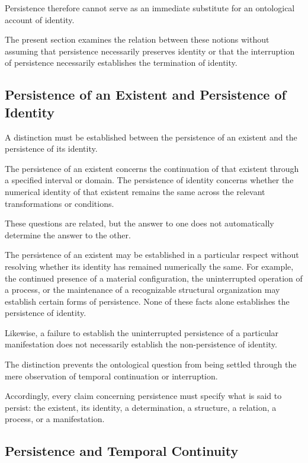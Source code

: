 Persistence therefore cannot serve as an immediate
substitute for an ontological account of identity.

The present section examines the relation between these
notions without assuming that persistence necessarily
preserves identity or that the interruption of persistence
necessarily establishes the termination of identity.

\subsection{Persistence of an Existent and Persistence of Identity}

A distinction must be established between the persistence
of an existent and the persistence of its identity.

The persistence of an existent concerns the continuation
of that existent through a specified interval or domain.
The persistence of identity concerns whether the numerical
identity of that existent remains the same across the
relevant transformations or conditions.

These questions are related, but the answer to one does
not automatically determine the answer to the other.

The persistence of an existent may be established in
a particular respect without resolving whether its
identity has remained numerically the same. For example,
the continued presence of a material configuration,
the uninterrupted operation of a process, or the
maintenance of a recognizable structural organization
may establish certain forms of persistence. None of
these facts alone establishes the persistence of identity.

Likewise, a failure to establish the uninterrupted
persistence of a particular manifestation does not
necessarily establish the non-persistence of identity.

The distinction prevents the ontological question from
being settled through the mere observation of temporal
continuation or interruption.

Accordingly, every claim concerning persistence must
specify what is said to persist: the existent, its identity,
a determination, a structure, a relation, a process,
or a manifestation.

\subsection{Persistence and Temporal Continuity}

